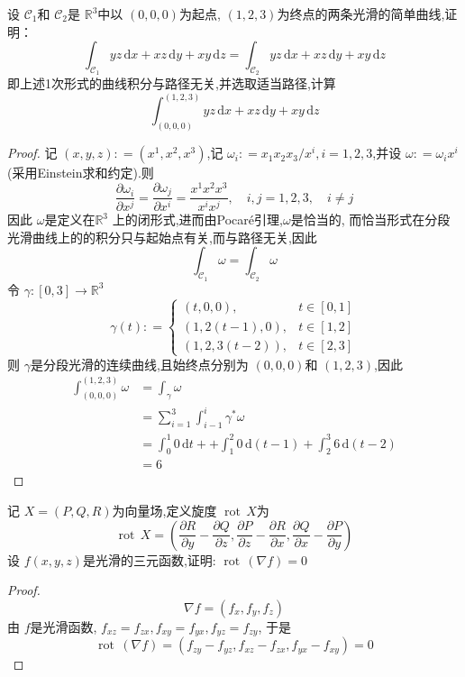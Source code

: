 \documentclass[lang=cn,12pt,color=green,fontset=none,thmcnt=section]{elegantbook}
\begin{document}
\begin{exercise}
    设 $ \mathcal{C}_{1} $和 $ \mathcal{C}_{2} $是 $ \mathbb{R} ^{3} $中以 $ \left( 0,0,0 \right)  $为起点, $ \left( 1,2,3\right)  $为终点的两条光滑的简单曲线,证明： $$
    \int_{\mathcal{C}_{1}}yz\,\mathrm{d} x+ xz\,\mathrm{d}y + xy\,\mathrm{d} z = \int_{\mathcal{C}_{2}} yz\,\mathrm{d} x+ xz\,\mathrm{d} y+ xy\,\mathrm{d} z
    $$ 即上述1次形式的曲线积分与路径无关,并选取适当路径,计算 $$
    \int_{\left( 0,0,0 \right) }^{\left( 1,2,3\right) } yz\,\mathrm{d} x+ xz\,\mathrm{d} y+ xy\,\mathrm{d} z
    $$
\end{exercise}
\begin{proof}
    记 $ \left( x,y,z \right): = \left( x^{1},x^{2},x^{3} \right)   $,记 $ \omega _{i}: =  {x_1x_2x_3 }/{x^{i} } ,i= 1,2,3 $,并设 $ \omega : = \omega _{i}x^{i} $  (采用Einstein求和约定).则 $$
    \frac{\partial \omega _{i}}{\partial x^{j}} = \frac{\partial \omega _{j}}{\partial x^{i}} =  \frac{x^{1}x^{2}x^{3} }{x^{i}x^{j} },\quad  i,j = 1,2,3 ,\quad i \neq j
    $$ 因此 $ \omega  $是定义在$ \mathbb{R} ^{3} $ 上的闭形式,进而由Pocaré引理,$ \omega  $是恰当的, 而恰当形式在分段光滑曲线上的的积分只与起始点有关,而与路径无关,因此 $$
    \int_{\mathcal{C}_{1}}\omega = \int_{\mathcal{C}_{2}}\omega 
    $$令 $ \gamma :[0,3]\to  \mathbb{R} ^{3} $ $$
    \gamma  \left( t \right): = \begin{cases} \left( t,0,0 \right),& t \in [0,1]\\ 
     \left( 1,2\left( t-1 \right),0  \right),& t \in [1,2]\\ 
      \left( 1,2,3\left( t-2 \right)  \right),& t\in  [2,3]    \end{cases}  
    $$ 则 $ \gamma  $是分段光滑的连续曲线,且始终点分别为 $ \left( 0,0,0 \right)  $和 $ \left( 1,2,3 \right)  $,因此 $$
   \begin{aligned}
    \int_{\left( 0,0,0 \right) }^{\left( 1,2,3 \right) } \omega & = \int_{\gamma }\omega \\ 
     & = \sum _{i=1}^{3} \int_{i-1}^{i} \gamma ^{*}\omega \\ 
      & = \int_{0}^{1} 0 \,\mathrm{d} t+ +  \int_{1}^{2}  0\,\mathrm{d} \left( t-1 \right)+  \int_{2}^{3} 6 \,\mathrm{d} \left( t-2 \right)  \\ 
       & = 6
   \end{aligned}
    $$   
\end{proof}
\begin{exercise}
    记 $ X = \left( P,Q,R \right)  $为向量场,定义旋度 $ \operatorname{rot}\, X $为 $$
    \operatorname{rot}\,X = \left( \frac{\partial R}{\partial y}-\frac{\partial Q}{\partial z}, \frac{\partial P}{\partial z}- \frac{\partial R}{\partial x}, \frac{\partial Q}{\partial x}- \frac{\partial P}{\partial y} \right) 
    $$  设 $ f\left( x,y,z \right)  $是光滑的三元函数,证明: $ \operatorname{rot}\,\left( \nabla f \right)=0  $  
\end{exercise}
\begin{proof}
    $$
    \nabla f= \left( f_{x},f_{y},f_{z} \right) 
    $$由 $ f $是光滑函数, $ f_{xz}= f_{zx},f_{xy}=f_{yx},f_{yz} = f_{zy} $,  于是 $$
    \operatorname{rot}\,\left( \nabla f \right) = \left(f_{zy}-f_{yz},f_{xz}-f_{zx}, f_{yx} -f_{xy}\right) =0  
    $$
\end{proof}
\end{document}
